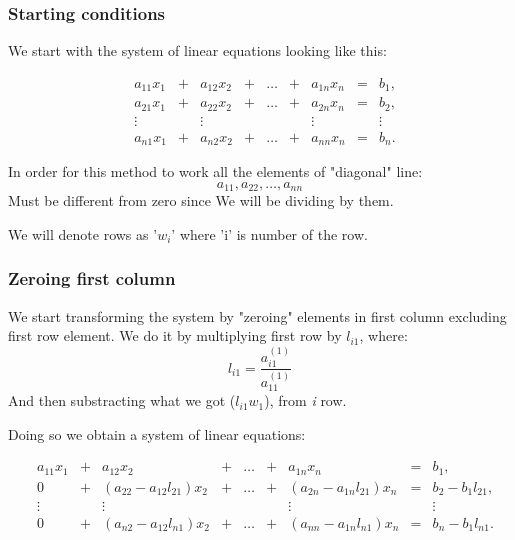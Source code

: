 \documentclass[12pt]{report}
\begin{document}
\subsubsection{Starting conditions}
We start with the system of linear equations looking like this:

\[
\begin{matrix}

&a_{11}x_1 &{}+&a_{12}x_2&+&\dots&+&a_{1n}x_n &=&b_1,\\

&a_{21}x_1 &{}+&a_{22}x_2&+&\dots&+&a_{2n}x_n &=&b_2,\\

&\vdots    &&\vdots      & &     & &  \vdots  & &\vdots\\

&a_{n1}x_1&{}+&a_{n2}x_2&+&\dots &+&a_{nn}x_n&=&b_n.

\end{matrix}
\]

In order for this method to work all the elements of "diagonal" line:
\[ a_{11}, a_{22}, \dots, a_{nn} \]
Must be different from zero since We will be dividing by them.

We will denote rows as '$w_i$' where 'i' is number of the row.

\subsubsection{Zeroing first column}
We start transforming the system by "zeroing" elements in first column excluding first row element. We do it by multiplying first row by $l_{i1}$, where:
\[ l_{i1} = \frac{ a_{i1}^{(1)} }
{ a_{11}^{(1)} }  \]
And then substracting what we got ($ l_{i1}w_1 $), from \textit{i} row.

Doing so we obtain a system of linear equations:

\[
\begin{matrix}

&a_{11}x_1 &{}+&a_{12}x_2&+&\dots&+&a_{1n}x_n &=&b_1,\\

&0 &{}+&(a_{22} - a_{12}l_{21})x_2&{}+&\dots&{}+&(a_{2n} - a_{1n}l_{21})x_n &=&b_2 - b_{1}l_{21},\\

&\vdots    &&\vdots      & &     & &  \vdots  & &\vdots\\

&0&{}+&(a_{n2} - a_{12}l_{n1})x_2&+&\dots &+&(a_{nn} - a_{1n}l_{n1})x_n&=&b_n - b_{1}l_{n1}.

\end{matrix}
\]
\end{document}
